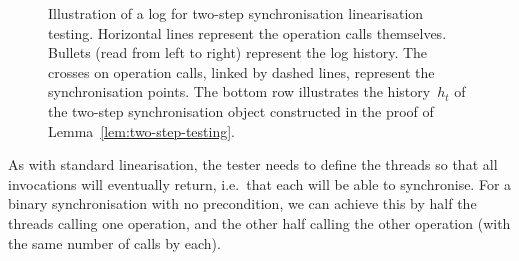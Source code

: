 \begin{figure}[tp]
\def\twoStep(#1,#2)#3{%
  \draw(#1-0.2,#2) \X; \draw(#1+0.2,#2) \X;
  \draw(#1-0.2,#2-0.4) node{\footnotesize #3};
}
\begin{center}
\end{center}
\caption{Illustration of a log for two-step synchronisation linearisation
  testing.  Horizontal lines represent the operation calls themselves.
  Bullets (read from left to right) represent the log history.  The crosses on
  operation calls, linked by dashed lines, represent the synchronisation
  points.  The bottom row illustrates the history~$h_t$ of the two-step
  synchronisation object constructed in the proof of
  Lemma~\ref{lem:two-step-testing}.}
\label{fig:two-step-log}
\end{figure}


As with standard linearisation, the tester needs to define the
threads so that all invocations will eventually return, i.e.~that each will be
able to synchronise.  For a binary synchronisation with no precondition, we
can achieve this by half the threads calling one operation, and the other half
calling the other operation (with the same number of calls by each).

